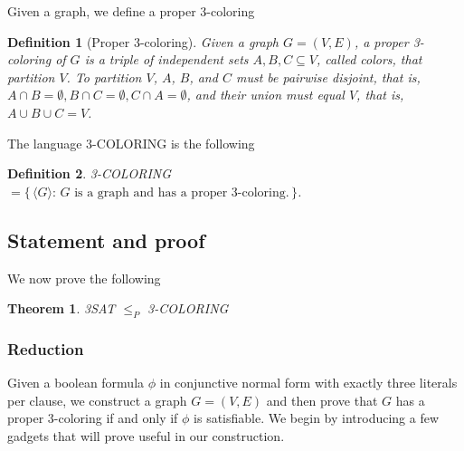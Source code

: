 \documentclass{article}
\newcommand{\theoremname}{Theorem}
\newcommand{\definitionname}{Definition}
\newtheorem{theorem}{\theoremname}
\newtheorem{definition}{\definitionname}
\newcommand{\st}{\colon\,}
\begin{document}
Given a graph, we define a proper 3-coloring
\begin{definition}[Proper 3-coloring]
  Given a graph $G=(V,E)$, a proper 3-coloring of $G$ is a triple of
  independent sets $A,B,C\subseteq V$, called colors, that partition $V$. To
  partition $V$, $A$, $B$, and $C$ must be pairwise
  disjoint, that is, $A\cap B =\emptyset,B\cap C=\emptyset,C\cap A =\emptyset$,
  and their union must equal $V$, that is, $A\cup B\cup C = V$.
\end{definition}

The language 3-COLORING is the following
\begin{definition}
  3-COLORING $= \{\, \langle G \rangle \st \text{$G$ is a graph and has
  a proper 3-coloring.}\,\}$.
\end{definition}

\subsection{Statement and proof}

We now prove the following
\begin{theorem}
	3SAT $\le_P$ 3-COLORING
\end{theorem}

\subsubsection{Reduction}

Given a boolean formula $\phi$ in conjunctive normal form with exactly three
literals per clause, we construct a graph $G = (V,E)$ and then prove that $G$
has a proper 3-coloring if and only if $\phi$ is satisfiable. We begin by
introducing a few gadgets that will prove useful in our construction.
\end{document}
